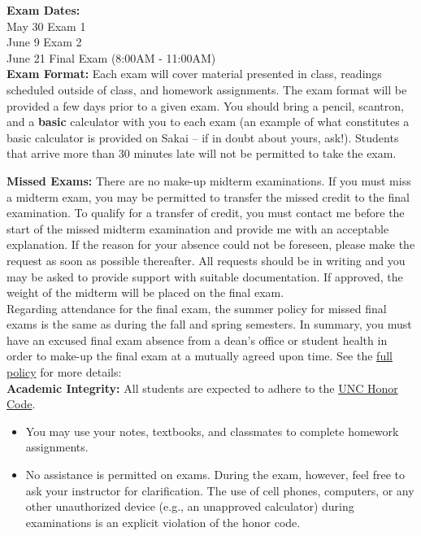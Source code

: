 \documentclass[11pt]{article}
\begin{document}
\textbf{Exam Dates:} \\
May 30  \hspace{5.31cm} Exam 1\\
June 9 \hspace{5.45cm} Exam 2\\
June 21  \hspace{5.25cm} Final Exam (8:00AM - 11:00AM) \\

\textbf{Exam Format:} Each exam will cover material presented in class, readings scheduled outside of class, and homework assignments. The exam format will be provided a few days prior to a given exam. You should bring a pencil, scantron, and a \textbf{basic} calculator with you to each exam (an example of what constitutes a basic calculator is provided on Sakai -- if in doubt about yours, ask!). Students that arrive more than 30 minutes late will not be permitted to take the exam. 



\newpage
\textbf{Missed Exams:} There are no make-up midterm examinations. If you must miss a midterm exam, you may be permitted to transfer the missed credit to the final examination. To qualify for a transfer of credit, you must contact me before the start of the missed midterm examination and provide me with an acceptable explanation. If the reason for your absence could not be foreseen, please make the request as soon as possible thereafter. All requests should be in writing and you may be asked to provide support with suitable documentation. If approved, the weight of the midterm will be placed on the final exam. \\

Regarding attendance for the final exam, the summer policy for missed final exams is the same as during the fall and spring semesters. In summary, you must have an excused final exam absence from a dean's office or student health in order to make-up the final exam at a mutually agreed upon time. See the \href{http://catalog.unc.edu/policies-procedures/attendance-grading-examination/#Final Examinations}{full policy} for more details: \\

\textbf{Academic Integrity:} All students are expected to adhere to the \href{http://instrument.unc.edu}{UNC Honor Code}. 
\begin{itemize}
	\item You may use your notes, textbooks, and classmates to complete homework assignments.
	\item No assistance is permitted on exams. During the exam, however, feel free to ask your instructor for clarification. The use of cell phones, computers, or any other unauthorized device (e.g., an unapproved calculator) during examinations is an explicit violation of the honor code.
\end{itemize}
\end{document}
